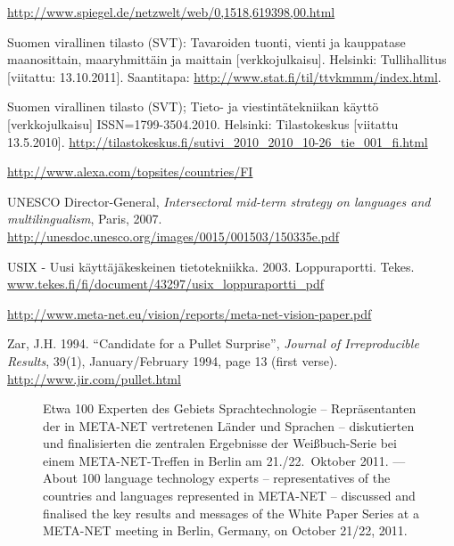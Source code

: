 \documentclass[]{../../metanetpaper}
\begin{document}
\begin{thebibliography}{102}
\url{http://www.spiegel.de/netzwelt/web/0,1518,619398,00.html}

Suomen virallinen tilasto (SVT): Tavaroiden tuonti, vienti ja kauppatase
maanosittain, maaryhmittäin ja maittain [verkkojulkaisu]. Helsinki:
Tullihallitus [viitattu: 13.10.2011].
Saantitapa: \url{http://www.stat.fi/til/ttvkmmm/index.html}.

Suomen virallinen tilasto (SVT); Tieto- ja viestintätekniikan käyttö
[verkkojulkaisu] ISSN=1799-3504.2010. Helsinki: Tilastokeskus [viitattu
13.5.2010].
\url{http://tilastokeskus.fi/sutivi_2010_2010_10-26_tie_001_fi.html}

\url{http://www.alexa.com/topsites/countries/FI}

UNESCO Director-General,
\emph{Intersectoral mid-term strategy on languages and multilingualism},
Paris, 2007.
\url{http://unesdoc.unesco.org/images/0015/001503/150335e.pdf}

USIX - Uusi käyttäjäkeskeinen tietotekniikka. 2003. Loppuraportti. Tekes.
\url{www.tekes.fi/fi/document/43297/usix_loppuraportti_pdf}

\url{http://www.meta-net.eu/vision/reports/meta-net-vision-paper.pdf}

Zar, J.H. 1994. “Candidate for a Pullet Surprise”,
\emph{Journal of Irreproducible Results}, 39(1),
January/February 1994, page 13 (first verse).
\url{http://www.jir.com/pullet.html}

\end{thebibliography}


\renewcommand*{\figureformat}{}
\renewcommand*{\captionformat}{}

\begin{figure*}[htbp]
  \center
  \caption{Etwa 100 Experten des Gebiets Sprachtechnologie -- Repräsentanten der in META-NET vertretenen Länder und Sprachen -- diskutierten und finalisierten die zentralen Ergebnisse der Weißbuch-Serie bei einem META-NET-Treffen in Berlin am 21./22.~Oktober 2011. --- \textcolor{grey1}{About 100 language technology experts -- representatives of the countries and languages represented in META-NET -- discussed and finalised the key results and messages of the White Paper Series at a META-NET meeting in Berlin, Germany, on October 21/22, 2011.}}
\end{figure*}
\end{document}
